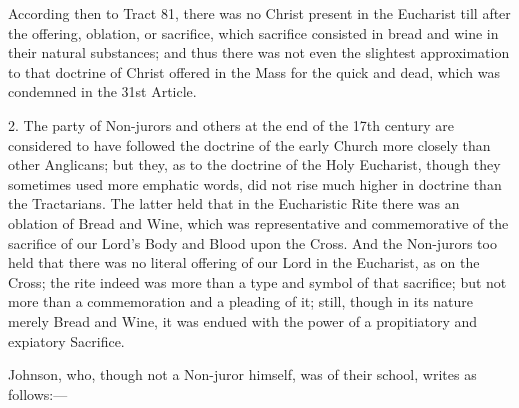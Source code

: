 According then to Tract 81, there was no Christ present in the
Eucharist till after the offering, oblation, or sacrifice, which
sacrifice consisted in bread and wine in their natural substances; and
thus there was not even the slightest approximation to that doctrine
of Christ offered in the Mass for the quick and dead, which was
condemned in the 31st Article.

2. The party of Non-jurors and others at the end of the 17th
century are considered to have followed the doctrine of the early
Church more closely than other Anglicans; but they, as to the doctrine
of the Holy Eucharist, though they sometimes used more emphatic words,
did not rise much higher in doctrine than the Tractarians. The latter
held that in the Eucharistic Rite there was an oblation of Bread and
Wine, which was representative and commemorative of the sacrifice of
our Lord's Body and Blood upon the Cross. And the Non-jurors too held
that there was no literal offering of our Lord in the Eucharist, as on
the Cross; the rite indeed was more than a type and symbol of that
sacrifice; but not more than a commemoration and a pleading of it;
still, though in its nature merely Bread and Wine, it was endued with
the power of a propitiatory and expiatory Sacrifice.

Johnson, who, though not a Non-juror himself, was of their school,
writes as follows:—

